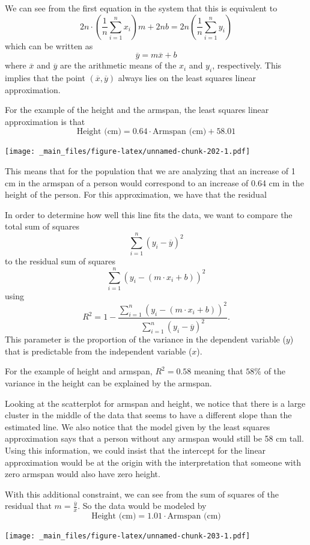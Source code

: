 \documentclass[
]{book}
\theoremstyle{definition}
\theoremstyle{definition}
\theoremstyle{definition}
\theoremstyle{definition}
\theoremstyle{remark}
\begin{document}
We can see from the first equation in the system that this is equivalent to
\[2n \cdot \left(\frac{1}{n}\sum_{i=1}^n x_i \right) m + 2n b = 2n \left(\frac{1}{n} \sum_{i=1}^n y_i \right)\] which can be written as \[\overline{y} = m \overline{x} +b\] where \(\overline{x}\) and \(\overline{y}\) are the arithmetic means of the \(x_i\) and \(y_i\), respectively. This implies that the point \((\overline{x},\overline{y})\) always lies on the least squares linear approximation.

For the example of the height and the armspan, the least squares linear approximation is that
\[\mbox{Height (cm)} = 0.64 \cdot \mbox{Armspan (cm)} + 58.01\]

\texttt{[image: \_main\_files/figure-latex/unnamed-chunk-202-1.pdf]}

This means that for the population that we are analyzing that an increase of 1 cm in the armspan of a person would correspond to an increase of 0.64 cm in the height of the person. For this approximation, we have that the residual

In order to determine how well this line fits the data, we want to compare the total sum of squares
\[\sum_{i=1}^n (y_i - \overline{y} )^2\] to the residual sum of squares \[\sum_{i=1}^n ( y_i - (m\cdot x_i +b))^2\] using
\[R^2 = 1 - \frac{\sum_{i=1}^n ( y_i - (m\cdot x_i +b))^2}{\sum_{i=1}^n (y_i - \overline{y} )^2}.\]
This parameter is the proportion of the variance in the dependent variable (\(y\)) that is predictable from the independent variable (\(x\)).

For the example of height and armspan, \(R^2= 0.58\) meaning that \(58\%\) of the variance in the height can be explained by the armspan.

Looking at the scatterplot for armspan and height, we notice that there is a large cluster in the middle of the data that seems to have a different slope than the estimated line. We also notice that the model given by the least squares approximation says that a person without any armspan would still be 58 cm tall. Using this information, we could insist that the intercept for the linear approximation would be at the origin with the interpretation that someone with zero armspan would also have zero height.

With this additional constraint, we can see from the sum of squares of the residual that \(m = \frac{\overline{y}}{\overline{x}}\). So the data would be modeled by
\[\mbox{Height (cm)} = 1.01 \cdot \mbox{Armspan (cm)} \]

\texttt{[image: \_main\_files/figure-latex/unnamed-chunk-203-1.pdf]}
\end{document}
